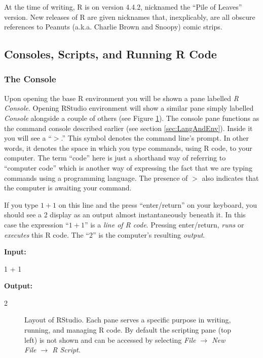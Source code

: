 At the time of writing, R is on version 4.4.2, nicknamed the ``Pile of Leaves'' version.  New releases of R are given nicknames that, inexplicably, are all obscure references to Peanuts (a.k.a. Charlie Brown and Snoopy) comic strips.

\subsection{Consoles, Scripts, and Running R Code}

\subsubsection{The Console}

Upon opening the base R environment you will be shown a pane labelled \textit{R Console}.  Opening RStudio environment will show a similar pane simply labelled \textit{Console} alongside a couple of others (see Figure \ref{fig:Rstudio}).  The console pane functions as the command console described earlier (see section \ref{sec:LangAndEnv}).  Inside it you will see a ``$>$.'' This symbol denotes the command line's prompt.  In other words, it denotes the space in which you type commands, using R code, to your computer.  The term ``code'' here is just a shorthand way of referring to ``computer code'' which is another way of expressing the fact that we are typing commands using a programming language. The presence of $>$ also indicates that the computer is awaiting your command.

If you type $1 + 1$ on this line and the press ``enter/return'' on your keyboard, you should see a 2 display as an output almost instantaneously beneath it.  In this case the expression ``$1 + 1$'' is a \textit{line of R code}.  Pressing enter/return, \textit{runs} or \textit{executes} this R code. The ``$2$'' is the computer's resulting \textit{output}.

\textbf{Input:}
\begin{inR}
1 + 1
\end{inR}

\vspace{1em}

\textbf{Output:}
\begin{outR}
[1] 2
\end{outR}

\begin{figure}[t]
\centering
{}
\caption{Layout of RStudio. Each pane serves a specific purpose in writing, running, and managing R code. By default the scripting pane (top left) is not shown and can be accessed by selecting \textit{File $\rightarrow$ New File $\rightarrow$ R Script}.}
\label{fig:Rstudio}
\end{figure}

